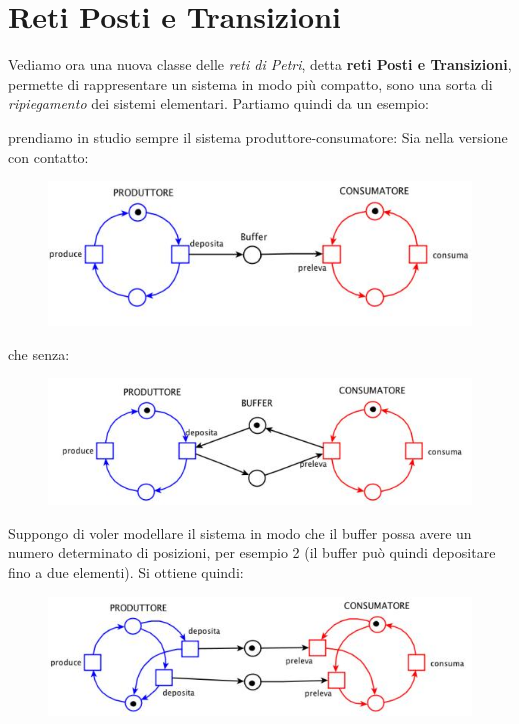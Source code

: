 \documentclass[a4paper,12pt, oneside]{book}
\begin{document}
\section{Reti Posti e Transizioni}
Vediamo ora una nuova classe delle \textit{reti di Petri}, detta \textbf{reti
  Posti e Transizioni}, permette di rappresentare un sistema in modo più
compatto, sono una sorta di \textit{ripiegamento} dei sistemi
elementari. Partiamo quindi da un esempio:
\begin{esempio}
  prendiamo in studio sempre il sistema produttore-consumatore:
  Sia nella versione con contatto:
  \begin{figure}[H]
    \centering
    \includegraphics[scale = 0.5]{img/pt.jpg} 
  \end{figure}
  che senza:
  \begin{figure}[H]
    \centering
    \includegraphics[scale = 0.5]{img/pt2.jpg} 
  \end{figure}
  Suppongo di voler modellare il sistema in modo che il buffer possa avere un
  numero determinato di posizioni, per esempio 2 (il buffer può quindi
  depositare fino a due elementi). Si ottiene quindi:
  \begin{figure}[H]
    \centering
    \includegraphics[scale = 0.6]{img/pt3.jpg} 
  \end{figure}

\end{esempio}
\end{document}
